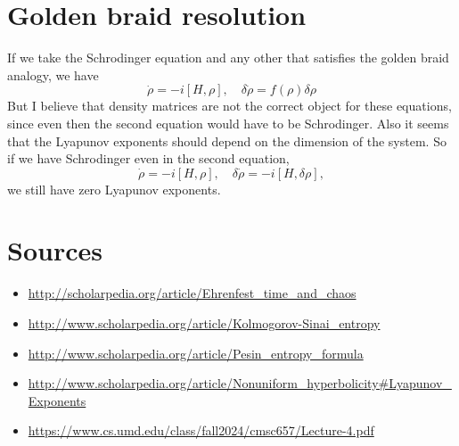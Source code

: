\documentclass{article}
\begin{document}
\section{Golden braid resolution}
If we take the Schrodinger equation and any other that satisfies the golden braid analogy, we have
\[
    \dot{\rho} = -i[H,\rho], \quad \delta\dot{\rho}  =f(\rho)\delta\rho
\]
But I believe that density matrices are not the correct object for these equations, since even then the second equation would have to be Schrodinger. Also it seems that the Lyapunov exponents should depend on the dimension of the system. So if we have Schrodinger even in the second equation, 
\[
    \dot{\rho} = -i[H,\rho], \quad \delta\dot{\rho}  =-i[H,\delta\rho],
\]
we still have zero Lyapunov exponents. 


\section{Sources}

\begin{itemize}
    \item \url{http://scholarpedia.org/article/Ehrenfest_time_and_chaos}
    \item \url{http://www.scholarpedia.org/article/Kolmogorov-Sinai_entropy}
    \item \url{http://www.scholarpedia.org/article/Pesin_entropy_formula}
    \item \url{http://www.scholarpedia.org/article/Nonuniform_hyperbolicity#Lyapunov_Exponents}
    \item \url{https://www.cs.umd.edu/class/fall2024/cmsc657/Lecture-4.pdf}
\end{itemize}
\end{document}
